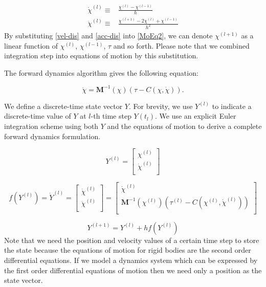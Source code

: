\documentclass[master,english,final]{kaist-ucs}
\begin{document}
\begin{align}
\dot\chi^{(l)}  \equiv {} & \frac{\chi^{(l)}-\chi^{(l-1)}}{h}\label{vel-dis}\\
\ddot\chi^{(l)} \equiv {} & \frac{\chi^{(l+1)}-2\chi^{(l)}+\chi^{(l-1)}}{h^2}\label{acc-dis}
\end{align}
By substituting \eqref{vel-dis} and \eqref{acc-dis} into \eqref{MoEq2},
we can denote $\chi^{(l+1)}$ as a linear function of $\chi^{(l)}$, $\chi^{(l-1)}$, $\tau$ and so forth.
Please note that we combined integration step into equations of motion by this substitution.

The forward dynamics algorithm gives the following equation:

\begin{equation}
\ddot\chi =\mathbf{M}^{-1}(\chi) ( \tau - C(\chi,\dot\chi) ).
\end{equation}

We define a discrete-time state vector $Y$. For brevity, we use $Y^{(l)}$
to indicate a discrete-time value of $Y$ at $l$-th time step $Y(t_l)$.
We use an explicit Euler integration
scheme using both $Y$ and the equations of motion to derive a complete
forward dynamics formulation.

\begin{equation}
Y^{(l)} =
\left[ {\begin{array}{cc}
 \chi^{(l)}   \\
 \dot\chi^{(l)}   \\
 \end{array} } \right]
\end{equation}

\begin{equation}
f(Y^{(l)})=\dot{Y}^{(l)}
=
\left[ {\begin{array}{cc}
 \dot\chi^{(l)}   \\
 \ddot\chi^{(l)}   \\
 \end{array} } \right]
 =
\left[ {\begin{array}{cc}
 \dot\chi^{(l)}   \\
 \mathbf{M}^{-1}(\chi^{(l)}) ( \tau^{(l)} - C(\chi^{(l)},\dot\chi^{(l)}) )   \\
 \end{array} } \right]
\end{equation}

\begin{equation}
Y^{(l+1)}=Y^{(l)}+hf(Y^{(l)})
\end{equation}
Note that we need the position and velocity values of a certain time step
to store the state because the equations of motion for rigid bodies
are the second order differential equations.
If we model a dynamics system
which can be expressed by the first order differential equations of motion
then we need only a position as the state vector.
\end{document}
